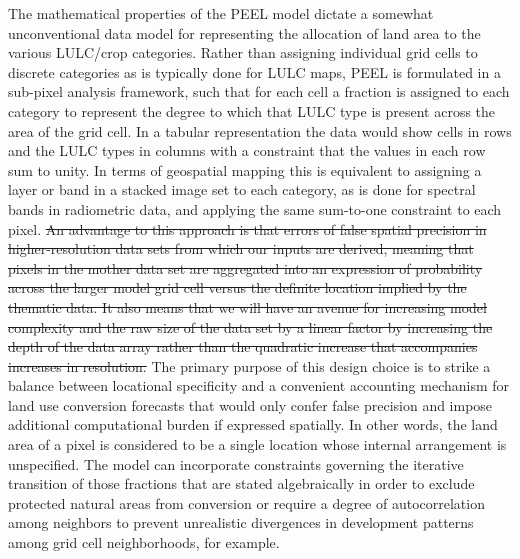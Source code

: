 The mathematical properties of the PEEL model dictate a somewhat
unconventional data model for representing the allocation of land area
to the various LULC\slash crop categories.  Rather than assigning
individual grid cells to discrete categories as is typically done for
LULC maps, PEEL is formulated in a sub-pixel analysis framework, such
that for each cell a fraction is assigned to each category to
represent the degree to which that LULC type is present across the
area of the grid cell.  In a tabular representation the data would
show cells in rows and the LULC types in columns with a constraint
that the values in each row sum to unity.  In terms of geospatial
mapping this is equivalent to assigning a layer or band in a stacked
image set to each category, as is done for spectral bands in
radiometric data, and applying the same sum-to-one constraint to each
pixel.  \sout{An advantage to this approach is that errors of false
  spatial precision in higher-resolution data sets from which our
  inputs are derived, meaning that pixels in the mother data set are
  aggregated into an expression of probability across the larger model
  grid cell versus the definite location implied by the thematic data.
  It also means that we will have an avenue for increasing model
  complexity and the raw size of the data set by a linear factor by
  increasing the depth of the data array rather than the quadratic
  increase that accompanies increases in resolution.}   The primary
purpose of this design choice is to strike a balance between
locational specificity and a convenient accounting mechanism for land
use conversion forecasts that would only confer false precision and
impose additional computational burden if expressed spatially.  In
other words, the land area of a pixel is considered to be a single
location whose internal arrangement is unspecified.  The model can
incorporate constraints governing the iterative transition of those
fractions that are stated algebraically in order to exclude protected
natural areas from conversion or require a degree of autocorrelation
among neighbors to prevent unrealistic divergences in development
patterns among grid cell neighborhoods, for example.

